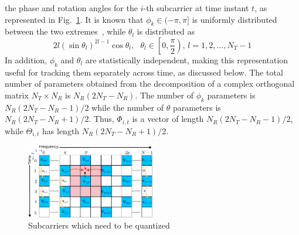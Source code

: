 \documentclass[journal,10pt,twocolumn]{IEEEtran}
\begin{document}
the phase and rotation angles for the $i$-th subcarrier at time
instant $t$, as represented in Fig.~\ref{fig:adpm-fig}. It is known
that $\phi_k \in (-\pi, \pi]$ is uniformly distributed between the
two extremes~\cite{4114278}, while $\theta_l$ is distributed as~\cite{4114278}
\begin{equation}
2l(\sin\theta_l)^{2l-1}\cos\theta_l, \mbox{  }\theta_l \in \left[0, \frac{\pi}{2}\right) \mbox{, } l = 1,2,\ldots,N_T -1
\end{equation}
In addition, $\phi_k$ and $\theta_l$ are statistically independent,
making this representation useful for tracking them separately across
time, as discussed below. The total number of
parameters obtained from the decomposition of a complex orthogonal
matrix $N_{T} \times N_{R} $ is $N_{R}(2N_{T} - N_{R})$. The number of
$\phi_k$ parameters is $N_{R}(2N_{T} - N_{R}-1)/2$ while the number of
$\theta$ parameters is $N_{R}(2N_{T} - N_{R}+1)/2$. Thus, $\Phi_{i,t}$
is a vector of length $N_{R}(2N_{T} - N_{R}-1)/2$, while
$\Theta_{i,t}$ has length $N_{R}(2N_{T} - N_{R}+1)/2$.
\begin{figure}
\includegraphics[width=0.5\textwidth]{images/new-adpm.pdf}
\caption{\label{fig:adpm-fig}Subcarriers which need to be quantized}
\end{figure}
\end{document}
